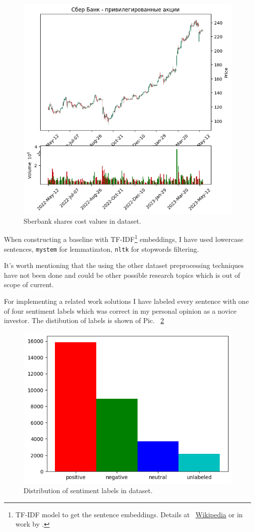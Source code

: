 \documentclass{article}
\begin{document}
\begin{figure}[!tbh]
    \centering
    \includegraphics[width=0.9\linewidth]{sber.png}
    \caption{Sberbank shares cost values in dataset.}
    \label{fig:sber}
\end{figure}

When constructing a baseline with TF-IDF\footnote{TF-IDF model to get the sentence embeddings. Details at ~\href{https://ru.wikipedia.org/wiki/TF-IDF}{Wikipedia} or in work by \cite{Ramos1999}.} embeddings, I have used lowercase sentences, \texttt{mystem} for lemmatizaton, \texttt{nltk} for stopwords filtering.

It's worth mentioning that the using the other dataset preprocessing techniques have not been done and could be other possible research topics which is out of scope of current.

For implementing a related work solutions I have labeled every sentence with one of four sentiment labels which was correct in my personal opinion as a novice investor. The distibution of labels is shown of Pic. ~\ref{fig:labels}

\begin{figure}[!tbh]
    \centering
    \includegraphics[width=0.5\linewidth]{labels.png}
    \caption{Distribution of sentiment labels in dataset.}
    \label{fig:labels}
\end{figure}
\end{document}
